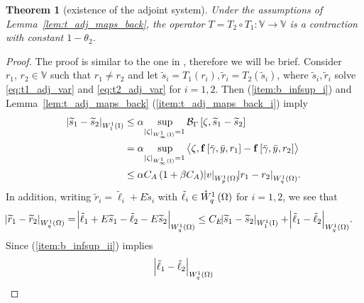 \documentclass[final]{siamltex}
\newtheorem{thm}[theorem]{Theorem}
\begin{document}
\begin{thm}[existence of the adjoint system] \label{thm:t_adj_contraction} 
Under the assumptions of \linebreak
Lemma~\ref{lem:t_adj_maps_back}, the operator $T = T_2 \circ T_1 : {\mathbb{V}} \rightarrow {\mathbb{V}}$ is a
contraction with constant $1-\theta_2$.
\end{thm}
\begin{proof} The proof is similar to the one in , therefore we will
be brief. Consider $r_1,\, r_2 \in {\mathbb{V}}$ such that $r_1 \neq r_2$ and let ${\widetilde{s}}_i = T_1(r_i), {\widetilde{r}}_i = T_2({\widetilde{s}}_i)$, where
${\widetilde{s}}_i,{\widetilde{r}}_i$ solve
\eqref{eq:t1_adj_var} and \eqref{eq:t2_adj_var} for $i=1, 2$. Then
 (\ref{item:b_infsup_i}) and Lemma~\ref{lem:t_adj_maps_back}
(\ref{item:t_adj_maps_back_i}) imply
	\begin{align*} 
		{\abs{{{\widetilde{s}}_1 - {\widetilde{s}}_2}}_{{W^{{{1}}}_{{{1}}}\del{{\text{\rm I}}}}}} 
			&\leq \alpha \sup_{{\abs{{\zeta}}_{{W^{{{1}}}_{{{\infty}}}\del{{\text{\rm I}}}}}}=1} {{\mathcal{B}}_\Gamma}\sbr{\zeta,{\widetilde{s}}_1 - {\widetilde{s}}_2} 
				\nonumber \\
			&= \alpha \sup_{{\abs{{\zeta}}_{{W^{{{1}}}_{{{\infty}}}\del{{\text{\rm I}}}}}}=1} 
				{\left\langle {\zeta,{\bf f}\sbr{{\bar{\gamma}},{\bar{y}},r_1} - {\bf f}\sbr{{\bar{\gamma}}, {\bar{y}}, r_2}} \right\rangle} 
					\nonumber \\
			&\leq  \alpha C_A \del{1+\beta C_A}{\abs{{v}}_{{W^{{1}}_{{p}}\del{{\Omega}}}}}{\abs{{r_1 - r_2}}_{{W^{{{1}}}_{{{q}}}\del{{{\Omega}}}}}} . 
	\end{align*}
         In addition, writing ${\widetilde{r}}_i=\tilde\ell_i+E{\widetilde{s}}_i$ with 
           $\tilde\ell_i\in{{\mathring{W}^{1}_{q}\del{{\Omega}}}}$ for $i=1,2$, we see that
	\begin{align*}  
		{\abs{{{\widetilde{r}}_1 - {\widetilde{r}}_2}}_{{W^{{{1}}}_{{{q}}}\del{{{\Omega}}}}}} 
			&= {\abs{{\tilde \ell_1 + E{\widetilde{s}}_1 - \tilde \ell_2 - E{\widetilde{s}}_2}}_{{W^{{{1}}}_{{{q}}}\del{{{\Omega}}}}}} 
			     \leq C_E{\abs{{{\widetilde{s}}_1 - {\widetilde{s}}_2}}_{{W^{{{1}}}_{{{1}}}\del{{\text{\rm I}}}}}} + {\abs{{\tilde \ell_1 - \tilde \ell_2}}_{{W^{{{1}}}_{{{q}}}\del{{{\Omega}}}}}}.
	\end{align*}
	Since  (\ref{item:b_infsup_ii}) implies
	\begin{align*}		
	        {\abs{{\tilde \ell_1 - \tilde \ell_2}}_{{W^{{{1}}}_{{{q}}}\del{{{\Omega}}}}}} 

\end{align*}
\end{proof}
\end{document}
